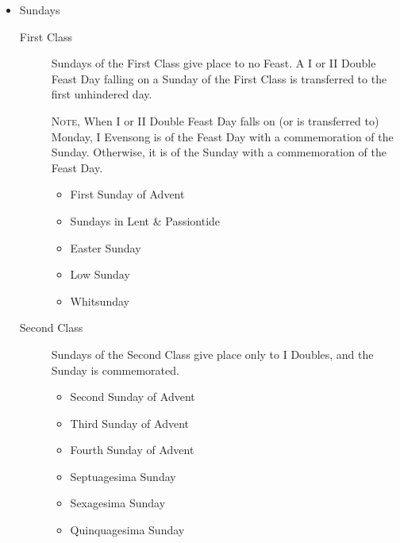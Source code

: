 \begin{itemize}
\begin{itemize}
\begin{itemize}
                    \item St. John the Evangelist Octave
                    \item Holy Innocents Octave
                    \item St. Lawrence Octave
                    \item Nativity of the Blessed Virgin Mary Octave
                    \item Divine Compassion Octave
                    \item An Octave of Secondary Patrons
                \end{itemize}
        \end{itemize}
    \item Sundays
        \begin{description}
            \item[First Class] Sundays of the First Class give place to no Feast. A I or II Double Feast Day falling on a Sunday of the First Class is transferred to the first unhindered day.\par
            \textsc{Note,} When I or II Double Feast Day falls on (or is transferred to) Monday, I Evensong is of the Feast Day with a commemoration of the Sunday. Otherwise, it is of the Sunday with a commemoration of the Feast Day.
                \begin{itemize}
                    \item First Sunday of Advent
                    \item Sundays in Lent \& Passiontide
                    \item Easter Sunday
                    \item Low Sunday
                    \item Whitsunday
                \end{itemize}
            \item[Second Class] Sundays of the Second Class give place only to I Doubles, and the Sunday is commemorated.
                \begin{itemize}
                    \item Second Sunday of Advent
                    \item Third Sunday of Advent
                    \item Fourth Sunday of Advent
                    \item Septuagesima Sunday
                    \item Sexagesima Sunday
                    \item Quinquagesima Sunday

\end{itemize}
\end{description}
\end{itemize}
